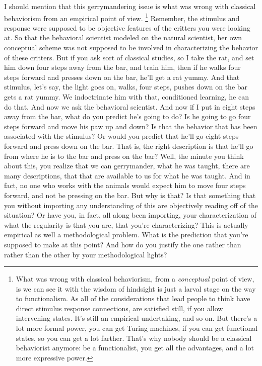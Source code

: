 I should mention that this gerrymandering issue is what was wrong with classical behaviorism from an empirical point of
view. \footnote{What was wrong with
classical behaviorism, from a \emph{conceptual} point of view, is we can see it with
the wisdom of hindsight is just a larval stage on the way to functionalism. As
all of the considerations that lead people to think have direct stimulus
response connections, are satisfied still, if you allow intervening states. It's still an empirical undertaking, and so on. But there's a
lot more formal power, you can get Turing machines, if you can get functional
states, so you can get a lot farther. That's why
nobody should be a classical behaviorist anymore: be a functionalist, you get
all the advantages, and a lot more expressive power.} Remember, the stimulus and response were supposed to be
objective features of the critters you were looking at. So that the behavioral
scientist modeled on the natural scientist, her own conceptual scheme was not
supposed to be involved in characterizing the behavior of these critters. But
if you ask sort of classical studies, so I take the rat, and set him down four
steps away from the bar, and train him, then if he walks four steps forward and
presses down on the bar, he'll get a rat yummy. And that stimulus, let's say,
the light goes on, walks, four steps, pushes down on the bar gets a rat yummy.
We indoctrinate him with that, conditioned learning, he can do that. And now
we ask the behavioral scientist. And now if I put in eight steps away from
the bar, what do you predict he's going to do? Is he going to go four steps
forward and move his paw up and down? Is that the behavior that has been
associated with the stimulus? Or would you predict that he'll go eight steps
forward and press down on the bar. That is, the right description is that he'll
go from where he is to the bar and press on the bar? Well, the minute you think
about this, you realize that we can gerrymander, what he was taught,
there are many descriptions, that that are available to us for what he was
taught. And in fact, no one who works with the animals would expect him to
move four steps forward, and not be pressing on the bar. But why
is that? Is that something that you without importing any understanding of
this are objectively reading off of the situation? Or have you, in fact, all
along been importing, your characterization of what the regularity
is that you are, that you're characterizing? This is actually empirical as well a methodological
problem. What is the prediction that you're supposed to make at this point?
And how do you justify the one rather than rather than the other by your
methodological lights?
